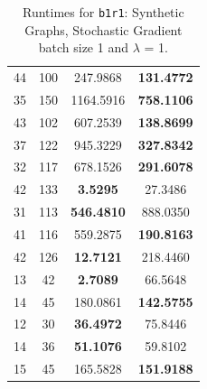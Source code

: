 \documentclass{article}
\begin{document}
\begin{table}[h]
\begin{tabular}{lccc}
44 & 100 & 247.9868 & \textbf{131.4772} \\
35 & 150 & 1164.5916 & \textbf{758.1106} \\
43 & 102 & 607.2539 & \textbf{138.8699} \\
37 & 122 & 945.3229 & \textbf{327.8342} \\
32 & 117 & 678.1526 & \textbf{291.6078} \\
42 & 133 & \textbf{3.5295} & 27.3486 \\
31 & 113 & \textbf{546.4810} & 888.0350 \\
41 & 116 & 559.2875 & \textbf{190.8163} \\
42 & 126 & \textbf{12.7121} & 218.4460 \\
13 & 42 & \textbf{2.7089} & 66.5648 \\
14 & 45 & 180.0861 & \textbf{142.5755} \\
12 & 30 & \textbf{36.4972} & 75.8446 \\
14 & 36 & \textbf{51.1076} & 59.8102 \\
15 & 45 & 165.5828 & \textbf{151.9188} \\
\bottomrule
\end{tabular}
\caption{Runtimes for \texttt{b1r1}: Synthetic Graphs, Stochastic Gradient batch size 1 and $\lambda$ = 1.}
\end{table}
\end{document}
